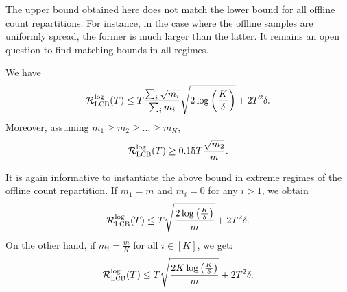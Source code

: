 \begin{remark}
    The upper bound obtained here does not match the lower bound for all offline count repartitions. For instance, in the case where the offline samples are uniformly spread, the former is much larger than the latter. It remains an open question to find matching bounds in all regimes. 
\end{remark}

\begin{proposition}\label{prop:regretlogginglcb}
We have
\[
\mathcal{R}^{\text{log}}_\textsc{LCB}(T) \leq T\frac{\sum_i \sqrt{m_i}}{\sum_i m_i}\sqrt{2\log\left(\frac{K}{\delta}\right)}+2T^2\delta.
\]
Moreover, assuming  $m_1\geq m_2\geq \ldots\geq m_K$,
\[
\mathcal{R}^{\text{log}}_\textsc{LCB}(T)\geq 0.15 T\frac{\sqrt{m_2}}{m}.
\]
\end{proposition}



It is again informative to instantiate the above bound in extreme regimes of the offline count repartition. If $m_1=m$ and $m_i=0$ for any $i>1$, we obtain
    \[\mathcal{R}^{\text{log}}_\textsc{LCB}(T) \leq T\sqrt{\frac{2\log\left(\frac{K}{\delta}\right)}{m}}+2T^2\delta.\]  
On the other hand, if $m_i=\frac{m}{K}$ for all $i \in [K]$, we get:      \[\mathcal{R}^{\text{log}}_\textsc{LCB}(T) \leq T\sqrt{\frac{2K\log\left(\frac{K}{\delta}\right)}{m}}+2T^2\delta.\]

